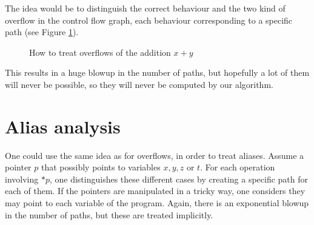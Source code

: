 \documentclass[a4paper,english,titlepage,11pt]{report}
\begin{document}
The idea would be to distinguish the correct behaviour and the two kind of
overflow in the control flow graph, each behaviour corresponding to a specific
path (see Figure \ref{overflow}).

\begin{figure}[!h]
\centering
{}
\caption{How to treat overflows of the addition $x+y$}
\label{overflow}
\end{figure}

This results in a huge blowup in the number of paths, but hopefully a lot of
them will never be possible, so they will never be computed by our algorithm.

	\section{Alias analysis}

One could use the same idea as for overflows, in order to treat aliases.
Assume a pointer $p$ that possibly points to variables $x,y,z$ or $t$. For each
operation involving $*p$, one distinguishes these different cases by
creating a specific path for each of them. 
If the pointers are manipulated in a tricky way, one considers they may
point to each variable of the program. Again, there is an exponential blowup in
the number of paths, but these are treated implicitly.
\end{document}
